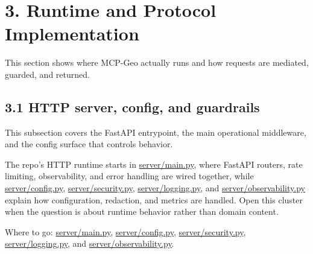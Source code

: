 \section{3. Runtime and Protocol
Implementation}\label{runtime-and-protocol-implementation}

This section shows where MCP-Geo actually runs and how requests are
mediated, guarded, and returned.

\subsection{3.1 HTTP server, config, and
guardrails}\label{http-server-config-and-guardrails}

This subsection covers the FastAPI entrypoint, the main operational
middleware, and the config surface that controls behavior.

The repo's HTTP runtime starts in
\href{https://github.com/chris-page-gov/mcp-geo/blob/fe862910da246ca77f374cfbe484985f5df4d316/server/main.py\#L19-L216}{server/main.py},
where FastAPI routers, rate limiting, observability, and error handling
are wired together, while
\href{https://github.com/chris-page-gov/mcp-geo/blob/fe862910da246ca77f374cfbe484985f5df4d316/server/config.py}{server/config.py},
\href{https://github.com/chris-page-gov/mcp-geo/blob/fe862910da246ca77f374cfbe484985f5df4d316/server/security.py}{server/security.py},
\href{https://github.com/chris-page-gov/mcp-geo/blob/fe862910da246ca77f374cfbe484985f5df4d316/server/logging.py}{server/logging.py},
and
\href{https://github.com/chris-page-gov/mcp-geo/blob/fe862910da246ca77f374cfbe484985f5df4d316/server/observability.py}{server/observability.py}
explain how configuration, redaction, and metrics are handled. Open this
cluster when the question is about runtime behavior rather than domain
content.

Where to go:
\href{https://github.com/chris-page-gov/mcp-geo/blob/fe862910da246ca77f374cfbe484985f5df4d316/server/main.py\#L1-L216}{server/main.py},
\href{https://github.com/chris-page-gov/mcp-geo/blob/fe862910da246ca77f374cfbe484985f5df4d316/server/config.py}{server/config.py},
\href{https://github.com/chris-page-gov/mcp-geo/blob/fe862910da246ca77f374cfbe484985f5df4d316/server/security.py}{server/security.py},
\href{https://github.com/chris-page-gov/mcp-geo/blob/fe862910da246ca77f374cfbe484985f5df4d316/server/logging.py}{server/logging.py},
and
\href{https://github.com/chris-page-gov/mcp-geo/blob/fe862910da246ca77f374cfbe484985f5df4d316/server/observability.py}{server/observability.py}.

